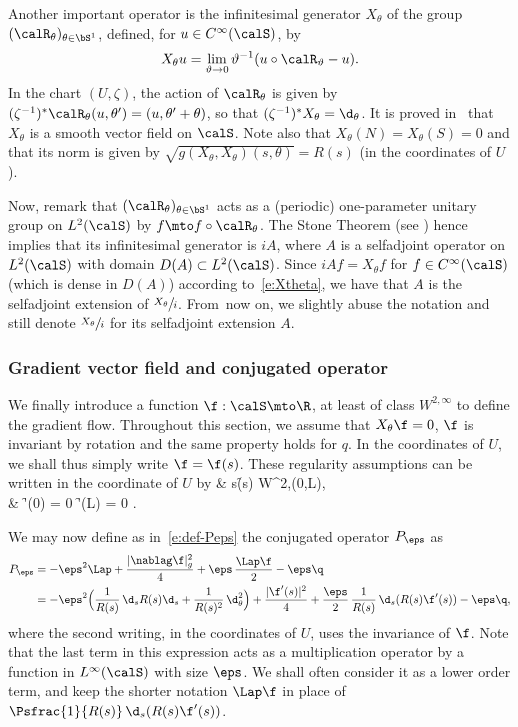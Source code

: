 Another important operator is the infinitesimal generator $X_\theta$ of the group $(\calR_\theta)_{\theta \in \bS^1}$, defined, for $u \in C^\infty(\calS)$, by
\begin{equation}
\label{e:Xtheta}
X_\theta u = \lim_{\vartheta \to 0} \vartheta^{-1} (u \circ \calR_\vartheta -u).
\end{equation}
In the chart $(U, \zeta)$, the action of $\calR_\theta$ is given by $(\zeta^{-1})^* \calR_\theta (u, \theta') = (u, \theta' +\theta)$, so that $(\zeta^{-1})^* X_\theta = \d_\theta$.
It is proved in~\cite[\S 3.2]{LL:18} that $X_\theta$ is a smooth vector field on $\calS$.
Note also that $X_\theta(N) = X_\theta(S)=0$ and that its norm is given by $\sqrt{g(X_\theta, X_\theta) (s, \theta)}= R(s)$ (in the coordinates of $U$).

Now, remark that $(\calR_\theta)_{\theta \in \bS^1}$ acts as a (periodic) one-parameter unitary group on $L^2(\calS)$ by $f \mto f\circ \calR_\theta$. The Stone Theorem (see \eg \cite[Th.\,VIII-8, p.\,266]{RS:I}) hence implies that its infinitesimal generator is $i A$, where $A$ is a selfadjoint operator on $L^2(\calS)$ with domain $D(A) \subset L^2(\calS)$. Since $i Af = X_\theta f$ for $f \in C^\infty(\calS)$ (which is dense in $D(A)$) according to~\eqref{e:Xtheta}, we have that $A$ is the selfadjoint extension of $\sfrac{X_\theta}{i}$. From~now on, we slightly abuse the notation and still denote $\sfrac{X_\theta}{i}$ for its selfadjoint extension $A$.

\subsubsection*{Gradient vector field and conjugated operator}
We finally introduce a function $\f : \calS \mto \R$, at least of class $W^{2,\infty}$ to define the gradient flow. Throughout this section, we assume that $X_\theta \f = 0$, \ie $\f$ is invariant by rotation and the same property holds for $q$. In the coordinates of $U$, we shall thus simply write $\f=\f(s)$. These regularity assumptions can be written in the coordinate of $U$ by
\baln
\label{e:reg-f}
& s\mto \f(s) \in W^{2,\infty}(0,L),  \nonumber\\
& \f'(0) = 0  \quad
{} \f'(L) = 0 .
\naln

We may now define as in~\eqref{e:def-Peps} the conjugated operator $P_\eps$ as
\begin{align}
\label{e:defPeps}
P_\eps & = - \eps^2 \Lap + \frac{|\nablag \f|_g^2}{4} + \eps\, \frac{\Lap \f}{2} -\eps \q\nonumber \\
& = - \eps^2 \Bigl( \frac{1}{R(s)}\, \d_s R(s) \d_s + \frac{1}{R(s)^2}\, \d_\theta^2 \Bigr) + \frac{|\f'(s)|^2}{4} + \frac{\eps}{2}\, \frac{1}{R(s)}\, \d_s (R(s)\f'(s)) -\eps \q,
\end{align}
where the second writing, in the coordinates of $U$, uses the invariance of $\f$. Note that the last term in this expression acts as a multiplication operator by a function in $L^\infty(\calS)$ with size $\eps$. We shall often consider it as a lower order term, and keep the shorter notation $\Lap \f$ in place of $\Psfrac{1}{R(s)}\, \d_s (R(s)\f'(s))$.

